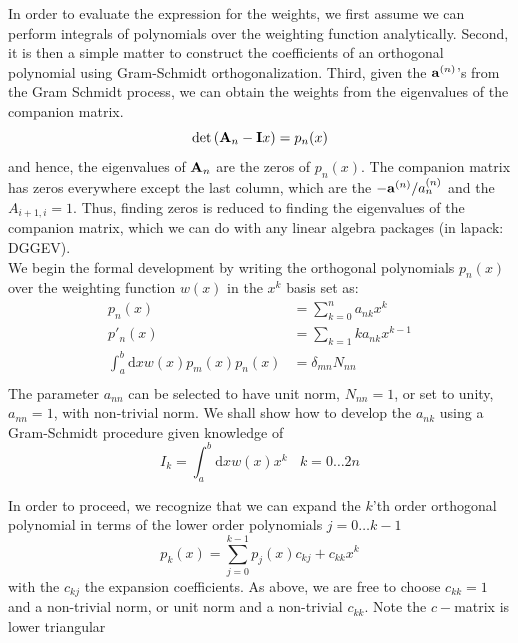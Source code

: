 \documentclass[paper=a4, fontsize=11pt]{article} %
\numberwithin{equation}{section} %
\numberwithin{figure}{section} %
\numberwithin{table}{section} %
\newcommand{\rd}{{\mathrm{d}}}
\begin{document}
In order to evaluate the expression for the weights, we first assume we can perform integrals of polynomials over the weighting function analytically. Second, it is then a simple matter to construct the coefficients of an orthogonal polynomial using Gram-Schmidt orthogonalization. Third, given the ${\bf a}^{(n)}$'s from the Gram Schmidt process, we can obtain the weights from the eigenvalues of the companion matrix.
\begin{equation}
\det \left({\bf A}_n- {\bf I} x\right) = p_n(x)
\end{equation}
and hence, the eigenvalues of ${\bf A}_n$ are the zeros of $p_n(x)$. The companion matrix has zeros everywhere except the last column, which are the $-{\bf a}^{(n)}/a_n^{(n)}$ and the $A_{i+1,i} = 1$.
Thus, finding zeros is reduced to finding the eigenvalues of the companion matrix, which we can do with any linear algebra packages (in lapack: DGGEV).\\


We begin the formal development by writing the orthogonal polynomials $p_n(x)$ over the weighting function $w(x)$ in the $x^k$ basis set as:
\begin{equation}
\begin{split}
p_n(x)  &= \sum_{k=0}^n a_{nk} x^k \\
p'_{n}(x) &= \sum_{k=1} k a_{nk} x^{k-1}\\
\int_a^b \rd x w(x) p_m(x) p_n(x) &= \delta_{mn} N_{nn} \\
\end{split}
\end{equation}
The parameter $a_{nn}$ can be selected to have unit norm, $N_{nn} = 1$, or set to unity, $a_{nn} = 1$, with non-trivial norm. We shall show how to develop the $a_{nk}$ using a Gram-Schmidt procedure given knowledge of
\begin{equation}
I_k = \int_a^b \rd x w(x) x^k\ \ \ \ k = 0\ldots 2n
\end{equation}

In order to proceed, we recognize that we can expand the $k$'th order orthogonal polynomial in terms of the lower order polynomials $j = 0 \ldots k-1$
\begin{equation}
p_k(x)  = \sum_{j=0}^{k-1} p_{j}(x) c_{kj} + c_{kk} x^k
\end{equation}
with the $c_{kj}$ the expansion coefficients. As above, we are free to choose $c_{kk} = 1$ and a non-trivial norm, or unit norm and a non-trivial $c_{kk}$. Note the $c-$matrix is lower triangular
\end{document}
